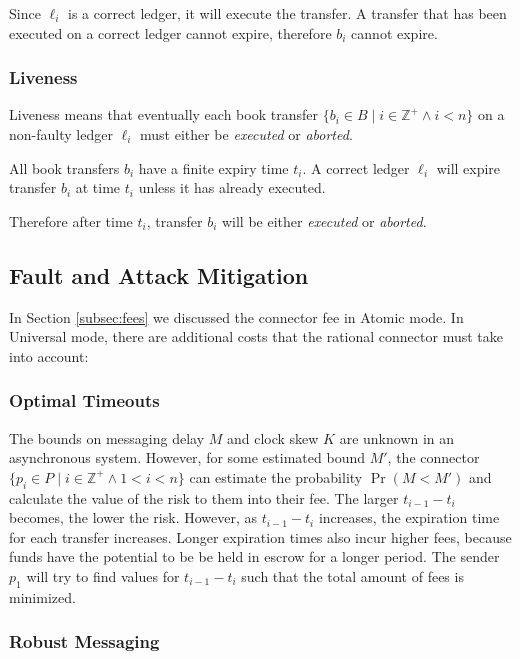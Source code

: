 \documentclass[letterpaper,twocolumn,10pt]{article}
\begin{document}
Since $\ell_i$ is a correct ledger, it will execute the transfer. A transfer that has been executed on a correct ledger cannot expire, therefore $b_i$ cannot expire.

\subsubsection{Liveness}

Liveness means that eventually each book transfer $ \{ b_i \in B \mid i \in \mathbb{Z}^+ \land i < n \} $ on a non-faulty ledger $\ell_i$ must either be \textit{executed} or \textit{aborted}.

All book transfers $b_i$ have a finite expiry time $t_i$. A correct ledger $\ell_i$ will expire transfer $b_i$ at time $t_i$ unless it has already executed.

Therefore after time $t_i$, transfer $b_i$ will be either \textit{executed} or \textit{aborted}.

\subsection{Fault and Attack Mitigation}

In Section \ref{subsec:fees} we discussed the connector fee in Atomic mode. In Universal mode, there are additional costs that the rational connector must take into account:

\subsubsection{Optimal Timeouts}
\label{subsubsec:optimal-timeouts}

The bounds on messaging delay $M$ and clock skew $K$ are unknown in an asynchronous system. However, for some estimated bound $M'$, the connector $ \{ p_i \in P \mid i \in \mathbb{Z}^+ \land 1 < i < n \} $ can estimate the probability $\Pr(M < M')$ and calculate the value of the risk to them into their fee. The larger $t_{i-1} - t_i$ becomes, the lower the risk. However, as $t_{i-1} - t_i$ increases, the expiration time for each transfer increases. Longer expiration times also incur higher fees, because funds have the potential to be be held in escrow for a longer period. The sender $p_1$ will try to find values for $t_{i-1} - t_i$ such that the total amount of fees is minimized.

\subsubsection{Robust Messaging}
\end{document}
